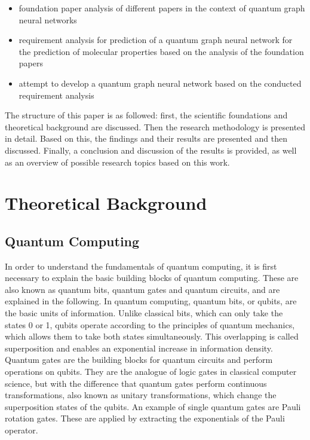 \begin{itemize}
    \item foundation paper analysis of different papers in the context of quantum graph neural networks
    \item requirement analysis for prediction of a quantum graph neural network for the prediction of molecular properties based on the analysis of the foundation papers
    \item attempt to develop a quantum graph neural network based on the conducted requirement analysis
\end{itemize}  

The structure of this paper is as followed: first, the scientific foundations and theoretical background are discussed. Then the research methodology is presented in detail. Based on this, the findings and their results are presented and then discussed. Finally, a conclusion and discussion of the results is provided, as well as an overview of possible research topics based on this work.   

\section{Theoretical Background}
\subsection{Quantum Computing}
In order to understand the fundamentals of quantum computing, it is first necessary to explain the basic building blocks of quantum computing. These are also known as quantum bits, quantum gates and quantum circuits, and are explained in the following. In quantum computing, quantum bits, or qubits, are the basic units of information. Unlike classical bits, which can only take the states 0 or 1, qubits operate according to the principles of quantum mechanics, which allows them to take both states simultaneously. This overlapping is called superposition and enables an exponential increase in information density. \cite{claudino2022basics} Quantum gates are the building blocks for quantum circuits and perform operations on qubits. They are the analogue of logic gates in classical computer science, but with the difference that quantum gates perform continuous transformations, also known as unitary transformations, which change the superposition states of the qubits. An example of single quantum gates are Pauli rotation gates. These are applied by extracting the exponentials of the Pauli operator.

